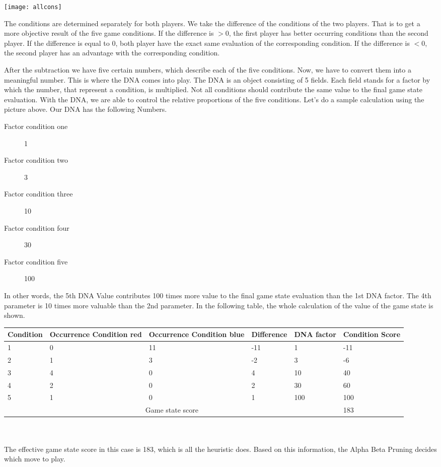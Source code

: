 \begin{fixedpic}
	\centering
	\texttt{[image: allcons]}
\end{fixedpic}
The conditions are determined separately for both players. We take the difference of the conditions of the two players. That is to get a more objective result of the five game conditions. If the difference is $>0$, the first player has better occurring conditions than the second player. If the difference is equal to $0$, both player have the exact same evaluation of the corresponding condition.
If the difference is $<0$, the second player has an advantage with the corresponding condition.


After the subtraction we have five certain numbers, which describe each of the five conditions.  Now, we have to convert them into a meaningful number. This is where the DNA comes into play. The DNA is an object consisting of 5 fields. Each field stands for a factor by which the number, that represent a  condition, is multiplied. Not all conditions should contribute the same value to the final game state evaluation. With the DNA, we are able to control the relative proportions of the five conditions. Let's do a sample calculation using the picture above. Our DNA has the following Numbers.
\begin{center}
\begin{description}
\item[Factor condition one] 1
\item[Factor condition two] 3
\item[Factor condition three] 10
\item[Factor condition four] 30
\item[Factor condition five] 100
\end{description}
\end{center}


In other words, the 5th DNA Value contributes 100 times more value to the final game state evaluation than the 1st DNA factor. The 4th parameter is 10 times more valuable than the 2nd parameter. In the following table, the whole calculation of the value of the game state is shown.

\begin{tabularx}{\textwidth}{|X|X|X|X|X|X|}
\hline
Condition & Occurrence Condition red & Occurrence Condition blue & Difference & DNA factor & Condition Score \\\hline
1	& 0	& 11	& -11	& 1 	& -11 \\\hline
2	& 1	& 3 	& -2	& 3 	& -6 \\\hline
3	& 4	& 0 	& 4 	& 10	& 40 \\\hline
4	& 2	& 0 	& 2 	& 30	& 60 \\\hline
5	& 1	& 0 	& 1 	& 100	& 100 \\\hline
\multicolumn{5}{|c|}{Game state score}&183 \\\hline
\end{tabularx}\\
\\
The effective game state score in this case is 183, which is all the heuristic does.
Based on this information, the Alpha Beta Pruning decides which move to play.

